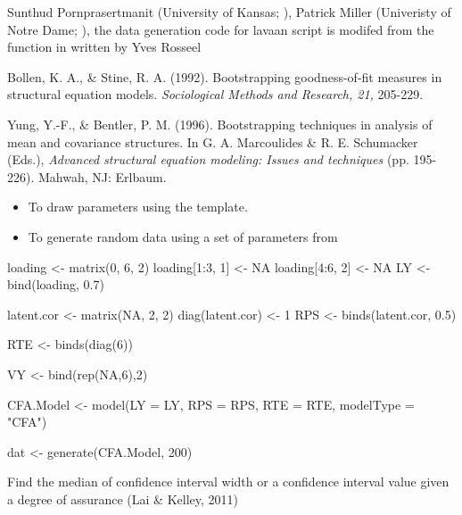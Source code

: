 \documentclass[a4paper]{book}
\begin{document}
%
\begin{Author}\relax
	
Sunthud Pornprasertmanit (University of Kansas; ), Patrick Miller (Univeristy of Notre Dame; ), the data generation code for lavaan script is modifed from the  function in  written by Yves Rosseel
\end{Author}
%
\begin{References}\relax
Bollen, K. A., \& Stine, R. A. (1992). Bootstrapping goodness-of-fit measures in structural equation models. \emph{Sociological Methods and Research, 21,} 205-229.

Yung, Y.-F., \& Bentler, P. M. (1996). Bootstrapping techniques in analysis of mean and covariance structures. In G. A. Marcoulides \& R. E. Schumacker (Eds.), \emph{Advanced structural equation modeling: Issues and techniques} (pp. 195-226). Mahwah, NJ: Erlbaum.
\end{References}
%
\begin{SeeAlso}\relax
\begin{itemize}

\item {} To draw parameters using the  template.
\item {} To generate random data using a set of parameters from 

\end{itemize}

\end{SeeAlso}
%
\begin{Examples}
\begin{ExampleCode}
loading <- matrix(0, 6, 2)
loading[1:3, 1] <- NA
loading[4:6, 2] <- NA
LY <- bind(loading, 0.7)

latent.cor <- matrix(NA, 2, 2)
diag(latent.cor) <- 1
RPS <- binds(latent.cor, 0.5)

RTE <- binds(diag(6))

VY <- bind(rep(NA,6),2)

CFA.Model <- model(LY = LY, RPS = RPS, RTE = RTE, modelType = "CFA")

dat <- generate(CFA.Model, 200)
\end{ExampleCode}
\end{Examples}
%
\begin{Description}\relax
Find the median of confidence interval width or a confidence interval value given a degree of assurance (Lai \& Kelley, 2011)
\end{Description}
\end{document}
